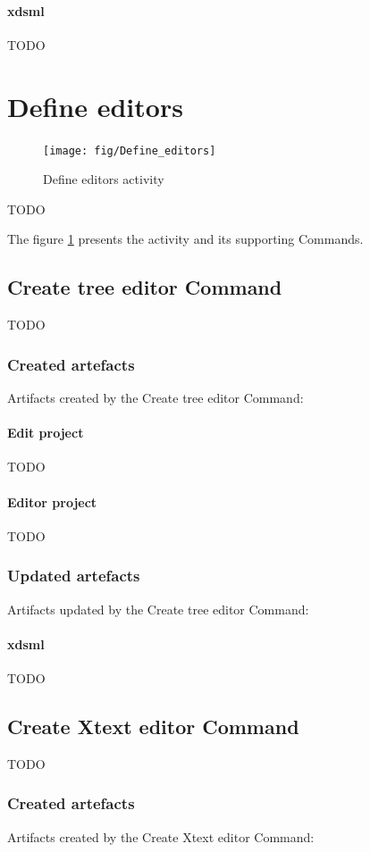 \documentclass{gemoc} %
\begin{document}
\paragraph{xdsml} 
TODO

\section{Define editors}
\label{sec:Define_editors}
\begin{figure}[h!]
		\center
		\texttt{[image: fig/Define\_editors]}
		\caption{Define editors activity}
		\label{fig:Define_editors}
\end{figure}

TODO

The figure \ref{fig:Define_editors} presents the activity and its supporting Commands.

\subsection{Create tree editor Command}
TODO
\subsubsection{Created artefacts}
Artifacts created by the Create tree editor Command:
\paragraph{Edit project} 
TODO\paragraph{Editor project} 
TODO
\subsubsection{Updated artefacts}
Artifacts updated by the Create tree editor Command:
\paragraph{xdsml} 
TODO

\subsection{Create Xtext editor Command}
TODO
\subsubsection{Created artefacts}
Artifacts created by the Create Xtext editor Command:
\end{document}
